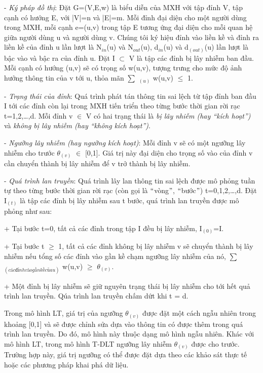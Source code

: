 		- {\itshape Ký pháp đồ thị}: Đặt G=(V,E,w) là biểu diễn của MXH với tập đỉnh V, tập cạnh có hướng E, với |V|=n và |E|=m. Mỗi đỉnh đại diện cho một người dùng trong MXH, mỗi cạnh e=(u,v) trong tập E tương ứng đại diện cho mỗi quan hệ giữa người dùng u và người dùng v. Chúng tôi ký hiệu đỉnh vào liền kề và đỉnh ra liền kề của đỉnh u lần lượt là N$_{in}$(u) và N$_{out}$(u), d$_{in}$(u) và d$_(out)$(u) lần lượt là bậc vào và bậc ra của đỉnh u. Đặt I $\subset$ V là tập các đỉnh bị lây nhiễm ban đầu. Mỗi cạnh có hướng (u,v) sẽ có trọng số w(u,v), tượng trưng cho mức độ ảnh hưởng thông tin của v tới u, thỏa mãn $\sum$ $_(u)$ w(u,v) $\leq$ 1.
 		
 		- {\itshape Trạng thái của đỉnh}: Quá trình phát tán thông tin sai lệch từ tập đỉnh ban đầu I tới các đỉnh còn lại trong MXH tiến triển theo từng bước thời gian rời rạc t=1,2,…,d. Mỗi đỉnh v $\in$ V có hai trạng thái là {\itshape bị lây nhiễm (hay “kích hoạt”)} và {\itshape không bị lây nhiễm (hay “không kích hoạt”)}.
 		
 		- {\itshape Ngưỡng lây nhiễm (hay ngưỡng kích hoạt)}: Mỗi đỉnh v sẽ có một ngưỡng lây nhiễm cho trước $\theta$$_(v)$ $\in$ [0,1]. Giá trị này đại diện cho trọng số vào của đỉnh v cần chuyển thành bị lây nhiễm để v trở thành bị lây nhiễm.
 		
 		- {\itshape Quá trình lan truyền}: Quá trình lây lan thông tin sai lệch được mô phỏng tuần tự theo từng bước thời gian rời rạc (còn gọi là $``$vòng$"$, $``$bước$"$) t=0,1,2,…,d. Đặt I$_(t)$ là tập các đỉnh bị lây nhiễm sau t bước, quá trình lan truyền được mô phỏng như sau:
 		
 		+ Tại bước t=0, tất cả các đỉnh trong tập I đều bị lây nhiễm, I$_(0)$=I.
 		
 		+ Tại bước t $\geq$ 1, tất cả các đỉnh không bị lây nhiễm v sẽ chuyển thành bị lây nhiễm nếu tổng số các đỉnh vào gần kề chạm ngưỡng lây nhiễm của nó, $\sum$$_(các đỉnh vào gần kề của u)$ w(u,v) $\geq$ $\theta$$_(v)$.	
 		
 		+ Một đỉnh bị lây nhiễm sẽ giữ nguyên trạng thái bị lây nhiễm cho tới hết quả trình lan truyền. Qúa trình lan truyền chấm dứt khi t = d.
 		
 		Trong mô hình LT, giá trị của ngưỡng $\theta$$_(v)$ được đặt một cách ngẫu nhiên trong khoảng [0,1] và sẽ được chỉnh sửa dựa vào thông tin có được thêm trong quá trình lan truyền. Do đó, mô hình này thuộc dạng mô hình ngẫu nhiên. Khác với mô hình LT, trong mô hình T-DLT ngưỡng lây nhiễm $\theta$$_(v)$ được cho trước. Trường hợp này, giá trị ngưỡng có thể được đặt dựa theo các khảo sát thực tế hoặc các phương pháp khai phá dữ liệu.
 		
